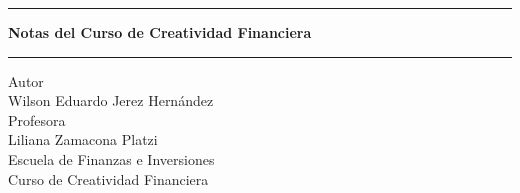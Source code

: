 \pagestyle{empty}
\begin{center}
\begin{figure}[h]
\centering


\end{figure}
\Large
\hrule
\vspace{4mm}
\textbf{Notas del Curso de Creatividad Financiera}\\

\vspace{4mm}
\hrule
\large
\vfill
Autor\\

Wilson Eduardo Jerez Hernández \\
\vfill
Profesora\\

Liliana Zamacona
\vfill
Platzi\\
Escuela de Finanzas e Inversiones\\
Curso de Creatividad Financiera\\
\end{center}
\newpage
